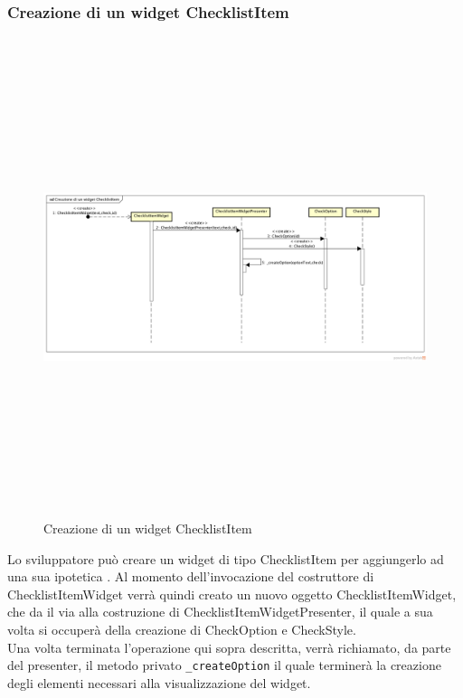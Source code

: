 \newpage

\subsubsection{Creazione di un widget ChecklistItem}

\label{Creazione di un widget ChecklistItem}
\begin{figure}[H]
	\centering
	\includegraphics[width=16cm, height=14cm]{Sezioni/Diagrammi/SDK/Creazione di un widget ChecklistItem.png}
	\caption{Creazione di un widget ChecklistItem}
\end{figure}

Lo sviluppatore può creare un widget di tipo ChecklistItem per aggiungerlo ad una sua ipotetica . Al momento dell'invocazione del costruttore di ChecklistItemWidget verrà quindi creato un nuovo oggetto ChecklistItemWidget, che da il via alla costruzione di ChecklistItemWidgetPresenter, il quale a sua volta si occuperà della creazione di CheckOption e CheckStyle.\\
Una volta terminata l'operazione qui sopra descritta, verrà richiamato, da parte del presenter, il metodo privato \texttt{_createOption} il quale terminerà la creazione degli elementi necessari alla visualizzazione del widget.
\newpage

